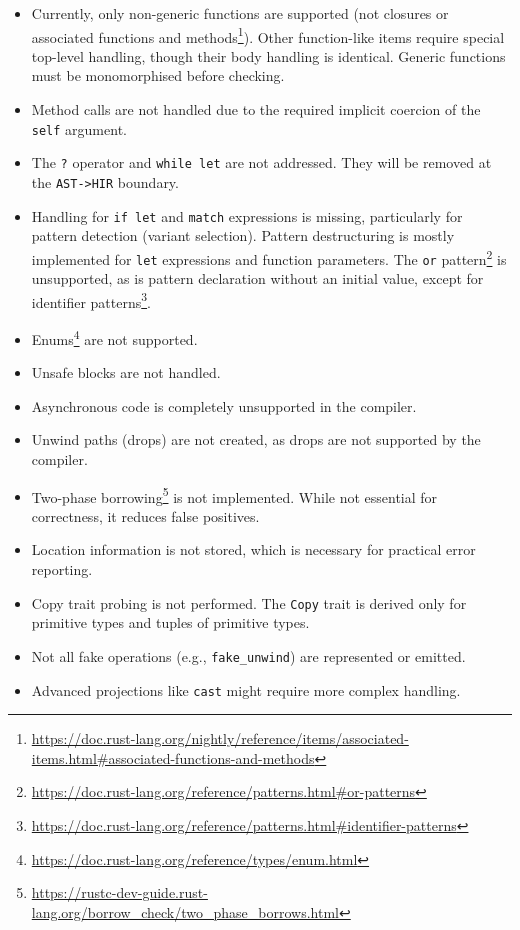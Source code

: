 \documentclass[
  11pt,
  twoside]{report}
\providecommand{\tightlist}{%
  \setlength{\itemsep}{0pt}\setlength{\parskip}{0pt}}
\DeclareRobustCommand{\href}[2]{#2\footnote{\url{#1}}}
\begin{document}
\begin{itemize}
\tightlist
\item
  Currently, only non-generic functions are supported (not closures or
  \href{https://doc.rust-lang.org/nightly/reference/items/associated-items.html\#associated-functions-and-methods}{associated
  functions and methods}). Other function-like items require special
  top-level handling, though their body handling is identical. Generic
  functions must be monomorphised before checking.
\item
  Method calls are not handled due to the required implicit coercion of
  the \texttt{self} argument.
\item
  The \texttt{?} operator and \texttt{while\ let} are not addressed.
  They will be removed at the \texttt{AST-\textgreater{}HIR} boundary.
\item
  Handling for \texttt{if\ let} and \texttt{match} expressions is
  missing, particularly for pattern detection (variant selection).
  Pattern destructuring is mostly implemented for \texttt{let}
  expressions and function parameters. The
  \href{https://doc.rust-lang.org/reference/patterns.html\#or-patterns}{\texttt{or}
  pattern} is unsupported, as is pattern declaration without an initial
  value, except for
  \href{https://doc.rust-lang.org/reference/patterns.html\#identifier-patterns}{identifier
  patterns}.
\item
  \href{https://doc.rust-lang.org/reference/types/enum.html}{Enums} are
  not supported.
\item
  Unsafe blocks are not handled.
\item
  Asynchronous code is completely unsupported in the compiler.
\item
  Unwind paths (drops) are not created, as drops are not supported by
  the compiler.
\item
  \href{https://rustc-dev-guide.rust-lang.org/borrow_check/two_phase_borrows.html}{Two-phase
  borrowing} is not implemented. While not essential for correctness, it
  reduces false positives.
\item
  Location information is not stored, which is necessary for practical
  error reporting.
\item
  Copy trait probing is not performed. The \texttt{Copy} trait is
  derived only for primitive types and tuples of primitive types.
\item
  Not all fake operations (e.g., \texttt{fake\_unwind}) are represented
  or emitted.
\item
  Advanced projections like \texttt{cast} might require more complex
  handling.
\end{itemize}
\end{document}
